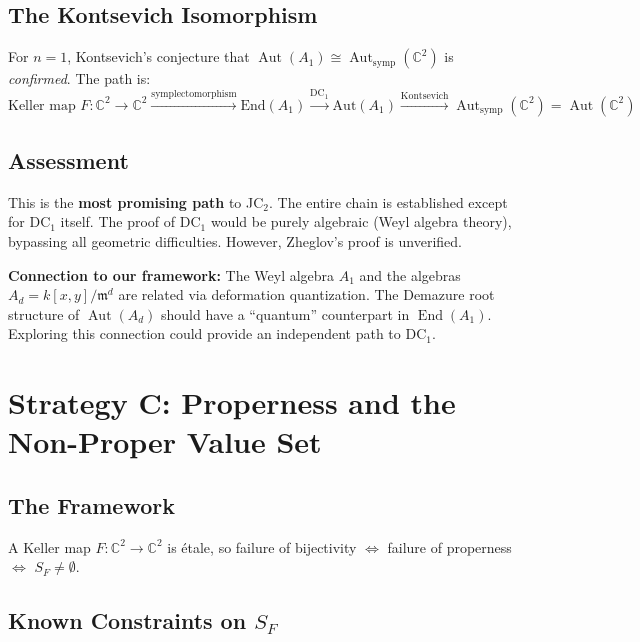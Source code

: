 \documentclass[12pt,a4paper]{article}
\theoremstyle{definition}
\newcommand{\CC}{\mathbb{C}}
\newcommand{\kk}{k}
\newcommand{\pp}{\mathfrak{m}}
\newcommand{\Aut}{\operatorname{Aut}}
\newcommand{\End}{\operatorname{End}}
\begin{document}
\subsection{The Kontsevich Isomorphism}

For $n = 1$, Kontsevich's conjecture that $\Aut(A_1) \cong \Aut_{\mathrm{symp}}(\CC^2)$
is \emph{confirmed}. The path is:
\[
  \text{Keller map } F: \CC^2 \to \CC^2 \xrightarrow{\text{symplectomorphism}}
  \text{End}(A_1) \xrightarrow{\text{DC}_1} \text{Aut}(A_1)
  \xrightarrow{\text{Kontsevich}} \Aut_{\mathrm{symp}}(\CC^2) = \Aut(\CC^2)
\]

\subsection{Assessment}
This is the \textbf{most promising path} to JC$_2$. The entire chain is
established except for DC$_1$ itself. The proof of DC$_1$ would be
purely algebraic (Weyl algebra theory), bypassing all geometric difficulties.
However, Zheglov's proof is unverified.

\textbf{Connection to our framework:} The Weyl algebra $A_1$ and the algebras
$A_d = \kk[x,y]/\pp^d$ are related via deformation quantization. The Demazure root
structure of $\Aut(A_d)$ should have a ``quantum'' counterpart in $\End(A_1)$.
Exploring this connection could provide an independent path to DC$_1$.

\section{Strategy C: Properness and the Non-Proper Value Set}

\subsection{The Framework}
A Keller map $F: \CC^2 \to \CC^2$ is \'etale, so failure of bijectivity
$\Leftrightarrow$ failure of properness $\Leftrightarrow$ $S_F \neq \emptyset$.

\subsection{Known Constraints on $S_F$}
\end{document}
